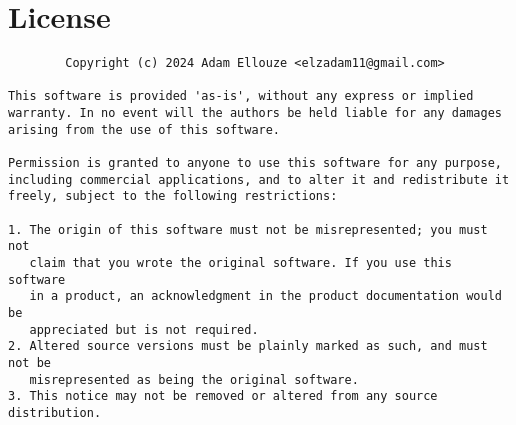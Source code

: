\documentclass{article}
\numberwithin{equation}{section}    %
\begin{document}
\section{License}
    \begin{lstlisting}
        Copyright (c) 2024 Adam Ellouze <elzadam11@gmail.com>

This software is provided 'as-is', without any express or implied
warranty. In no event will the authors be held liable for any damages
arising from the use of this software.

Permission is granted to anyone to use this software for any purpose,
including commercial applications, and to alter it and redistribute it
freely, subject to the following restrictions:

1. The origin of this software must not be misrepresented; you must not
   claim that you wrote the original software. If you use this software
   in a product, an acknowledgment in the product documentation would be
   appreciated but is not required.
2. Altered source versions must be plainly marked as such, and must not be
   misrepresented as being the original software.
3. This notice may not be removed or altered from any source distribution.
    \end{lstlisting}
\end{document}
